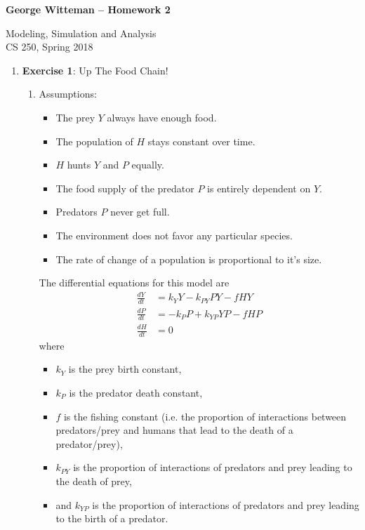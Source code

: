 \documentclass[12pt]{article}
\begin{document}
\begin{center}

\textbf{George Witteman -- Homework 2}

Modeling, Simulation and Analysis\\CS 250, Spring 2018

\end{center}

\begin{enumerate}
  \item \textbf{Exercise 1}: Up The Food Chain!
  \begin{enumerate}
    \setcounter{enumii}{0}
    
  	\item
			Assumptions:
	
			\begin{itemize}
				\item The prey $Y$ always have enough food.
				\item The population of $H$ stays constant over time.
				\item $H$ hunts $Y$ and $P$ equally.
				\item The food supply of the predator $P$ is entirely dependent on $Y$.
				\item Predators $P$ never get full.
				\item The environment does not favor any particular species.
				\item The rate of change of a population is proportional to it's size.
			\end{itemize}
			
			The differential equations for this model are
			\begin{align}
				\frac{dY}{dt} &= k_{Y}Y - k_{PY}PY - fHY\\
				\frac{dP}{dt} &= -k_{P}P + k_{YP}YP - fHP\\
				\frac{dH}{dt} &= 0
			\end{align}
			where 
			\begin{itemize}
				\item $k_{Y}$ is the prey birth constant,
				\item $k_{P}$ is the predator death constant,
				\item $f$ is the fishing constant (i.e. the proportion of interactions between predators/prey and humans that lead to the death of a predator/prey),
				\item $k_{PY}$ is the proportion of interactions of predators and prey leading to the death of prey,
				\item and $k_{YP}$ is the proportion of interactions of predators and prey leading to the birth of a predator.
			\end{itemize}
			

\end{enumerate}
\end{enumerate}
\end{document}
